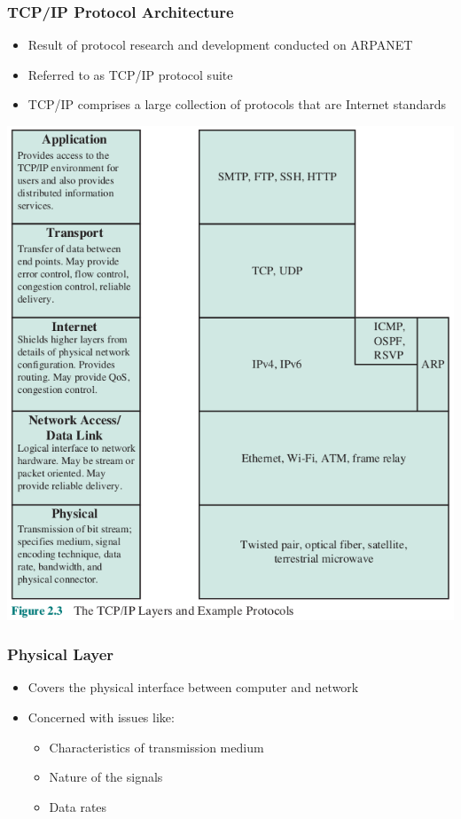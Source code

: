 \documentclass[pdflatex,compress]{beamer}
\begin{document}
\begin{frame}
	\frametitle{TCP/IP Protocol Architecture}
	\begin{itemize}
		\item Result of protocol research and development conducted on ARPANET
		\item Referred to as TCP/IP protocol suite
		\item TCP/IP comprises a large collection of protocols that are Internet standards
	\end{itemize}
\end{frame}

\begin{frame}
	\begin{center}
		\includegraphics[height=0.9\textheight]{img/img03}
	\end{center}
\end{frame}

\begin{frame}
	\frametitle{Physical Layer}
	\begin{itemize}
		\item Covers the physical interface between computer and network
		\item Concerned with issues like:
		\begin{itemize}
			\item Characteristics of transmission medium
			\item Nature of the signals
			\item Data rates
		\end{itemize}
	\end{itemize}
\end{frame}
\end{document}
